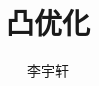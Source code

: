 \documentclass{notebook-neon}
\title{凸优化}
\author{李宇轩}
\begin{document}
\maketitle

\frontmatter

\makesymb

\tableofcontents
\listoffigures
\listoftables
\lstlistoflistings

\mainmatter

\nocite{*}








\appendix

\backmatter


\end{document}

